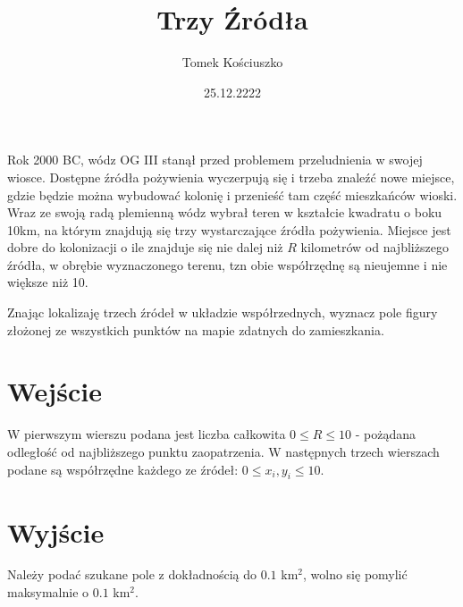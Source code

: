 \documentclass[zad,zawodnik,utf8]{sinol}
\title{Trzy Źródła}
\author{Tomek Kościuszko}
\date{25.12.2222}
\begin{document}
\begin{tasktext}%
    Rok 2000 BC, wódz OG III stanął przed problemem przeludnienia w swojej wiosce. Dostępne źródła pożywienia wyczerpują się i trzeba znaleźć nowe miejsce, gdzie będzie można wybudować kolonię i przenieść tam część mieszkańców wioski. Wraz ze swoją radą plemienną wódz wybrał teren w kształcie kwadratu o boku 10km, na którym znajdują się trzy wystarczające źródła pożywienia. Miejsce jest dobre do kolonizacji o ile znajduje się nie dalej niż $R$ kilometrów od najbliższego źródła, w obrębie wyznaczonego terenu, tzn obie współrzędnę są nieujemne i nie większe niż 10.

    Znając lokalizaję trzech źródeł w układzie współrzednych, wyznacz pole figury złożonej ze wszystkich punktów na mapie zdatnych do zamieszkania.

\section{Wejście}
    W pierwszym wierszu podana jest liczba całkowita $0 \leq R \leq 10$ - pożądana odległość od najbliższego punktu zaopatrzenia.
    W następnych trzech wierszach podane są współrzędne każdego ze źródeł: $0 \leq x_{i}, y_{i} \leq 10$.

\section{Wyjście}
    Należy podać szukane pole z dokładnością do $0.1$ km$^2$, wolno się pomylić maksymalnie o $0.1$ km$^2$.





\end{tasktext}
\end{document}
